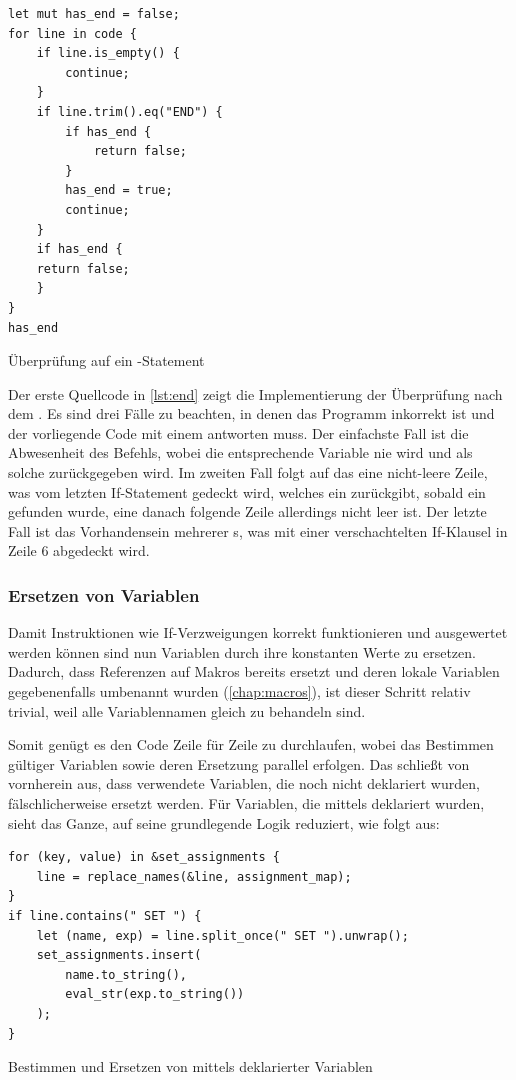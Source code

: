 \begin{listing}[th]
\begin{verbatim}
let mut has_end = false;
for line in code {
    if line.is_empty() {
        continue;
    }
    if line.trim().eq("END") {
        if has_end {
            return false;
        }
        has_end = true;
        continue;
    }
    if has_end {
    return false;
    }
}
has_end
\end{verbatim}
\label{lst:end}
\caption{Überprüfung auf ein -Statement}
\end{listing}

Der erste Quellcode in \ref{lst:end} zeigt die Implementierung der Überprüfung nach dem . Es sind drei Fälle zu beachten, in denen das Programm inkorrekt ist und der vorliegende Code mit einem  antworten muss. Der einfachste Fall ist die Abwesenheit des Befehls, wobei die entsprechende Variable nie  wird und als solche zurückgegeben wird. Im zweiten Fall folgt auf das  eine nicht-leere Zeile, was vom letzten If-Statement gedeckt wird, welches ein  zurückgibt, sobald ein  gefunden wurde, eine danach folgende Zeile allerdings nicht leer ist. Der letzte Fall ist das Vorhandensein mehrerer s, was mit einer verschachtelten If-Klausel in Zeile 6 abgedeckt wird.

\subsubsection{Ersetzen von Variablen}\label{chap:var-replacement}

Damit Instruktionen wie If-Verzweigungen korrekt funktionieren und ausgewertet werden können sind nun Variablen durch ihre konstanten Werte zu ersetzen. Dadurch, dass Referenzen auf Makros bereits ersetzt und deren lokale Variablen gegebenenfalls umbenannt wurden (\ref{chap:macros}), ist dieser Schritt relativ trivial, weil alle Variablennamen gleich zu behandeln sind.

Somit genügt es den Code Zeile für Zeile zu durchlaufen, wobei das Bestimmen gültiger Variablen sowie deren Ersetzung parallel erfolgen. Das schließt von vornherein aus, dass verwendete Variablen, die noch nicht deklariert wurden, fälschlicherweise ersetzt werden. Für Variablen, die mittels  deklariert wurden, sieht das Ganze, auf seine grundlegende Logik reduziert, wie folgt aus:

\begin{listing}[th]
\begin{verbatim}
for (key, value) in &set_assignments {
    line = replace_names(&line, assignment_map);
}
if line.contains(" SET ") {
    let (name, exp) = line.split_once(" SET ").unwrap();
    set_assignments.insert(
        name.to_string(),
        eval_str(exp.to_string())
    );
}
\end{verbatim}
\label{lst:var-replacement}
\caption{Bestimmen und Ersetzen von mittels  deklarierter Variablen}
\end{listing}

